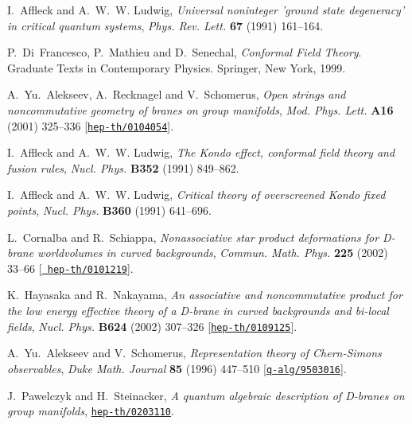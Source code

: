 \documentclass[12pt,a4paper]{article}
\begin{document}
\begin{thebibliography}{10}
I.~Affleck and A.~W.~W. Ludwig, {\it Universal noninteger 'ground state
  degeneracy' in critical quantum systems},  {\em Phys. Rev. Lett.} {\bf 67}
  (1991) 161--164.

P.~Di~Francesco, P.~Mathieu and D.~Senechal, {\em {Conformal Field Theory}}.
\newblock Graduate Texts in Contemporary Physics. Springer, New York, 1999.

A.~Yu.~Alekseev, A.~Recknagel and V.~Schomerus, {\it Open strings and
  noncommutative geometry of branes on group manifolds},  {\em Mod. Phys.
  Lett.} {\bf A16} (2001) 325--336
  [\href{http://arXiv.org/abs/hep-th/0104054}{{\tt hep-th/0104054}}].

I.~Affleck and A.~W.~W. Ludwig, {\it The {Kondo} effect, conformal field theory
  and fusion rules},  {\em Nucl. Phys.} {\bf B352} (1991) 849--862.

I.~Affleck and A.~W.~W. Ludwig, {\it Critical theory of overscreened {Kondo}
  fixed points},  {\em Nucl. Phys.} {\bf B360} (1991) 641--696.

L.~Cornalba and R.~Schiappa, {\it Nonassociative star product deformations for
  {D-brane} worldvolumes in curved backgrounds},  {\em Commun. Math. Phys.}
  {\bf 225} (2002) 33--66 [\href{http://arXiv.org/abs/hep-th/0101219}{{\tt
  hep-th/0101219}}].

K.~Hayasaka and R.~Nakayama, {\it An associative and noncommutative product for
  the low energy effective theory of a {D-brane} in curved backgrounds and
  bi-local fields},  {\em Nucl. Phys.} {\bf B624} (2002) 307--326
  [\href{http://arXiv.org/abs/hep-th/0109125}{{\tt hep-th/0109125}}].

A.~Yu.~Alekseev and V.~Schomerus, {\it Representation theory of {Chern-Simons}
  observables},  {\em Duke Math. Journal} {\bf 85} (1996) 447--510
  [\href{http://arXiv.org/abs/q-alg/9503016}{{\tt q-alg/9503016}}].

J.~Pawelczyk and H.~Steinacker, {\it A quantum algebraic description of
  {D-branes} on group manifolds},
  \href{http://arXiv.org/abs/hep-th/0203110}{{\tt hep-th/0203110}}.


\end{thebibliography}
\end{document}
